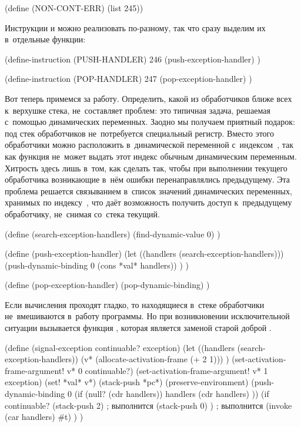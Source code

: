 \begin{code:lisp}
(define (NON-CONT-ERR) (list 245))
\end{code:lisp}

Инструкции  и  можно реализовать по-разному,
так что сразу выделим их в~отдельные функции:

\begin{code:lisp}
(define-instruction (PUSH-HANDLER) 246
  (push-exception-handler) )

(define-instruction (POP-HANDLER) 247
  (pop-exception-handler) )
\end{code:lisp}

Вот теперь примемся за работу. Определить, какой из обработчиков ближе всех
к~верхушке стека, не~составляет проблем: это типичная задача, решаемая с~помощью
динамических переменных. Заодно мы получаем приятный подарок: под стек
обработчиков не~потребуется специальный регистр. Вместо этого обработчики можно
расположить в~динамической переменной с~индексом~, так как функция
 не~может выдать этот индекс обычным динамическим
переменным. Хитрость здесь лишь в~том, как сделать так, чтобы при выполнении
текущего обработчика возникающие в~нём ошибки перенаправлялись предыдущему. Эта
проблема решается связыванием в~список значений динамических переменных,
хранимых по индексу~, что даёт возможность получить доступ к~предыдущему
обработчику, не~снимая со~стека текущий.

\begin{code:lisp}
(define (search-exception-handlers)
  (find-dynamic-value 0) )

(define (push-exception-handler)
  (let ((handlers (search-exception-handlers)))
    (push-dynamic-binding 0 (cons *val* handlers)) ) )

(define (pop-exception-handler)
  (pop-dynamic-binding) )
\end{code:lisp}

Если вычисления проходят гладко, то находящиеся в~стеке обработчики
не~вмешиваются в~работу программы. Но при возникновении исключительной
ситуации вызывается функция , которая является заменой
старой доброй .

\begin{code:lisp}
(define (signal-exception continuable? exception)
  (let ((handlers (search-exception-handlers))
        (v* (allocate-activation-frame (+ 2 1))) )
    (set-activation-frame-argument! v* 0 continuable?)
    (set-activation-frame-argument! v* 1 exception)
    (set! *val* v*)
    (stack-push *pc*) (preserve-environment)
    (push-dynamic-binding 0 (if (null? (cdr handlers)) handlers
                                (cdr handlers) ))
    (if continuable?
      (stack-push 2)   ; выполнится 
      (stack-push 0) ) ; выполнится 
    (invoke (car handlers) #t) ) )
\end{code:lisp}

